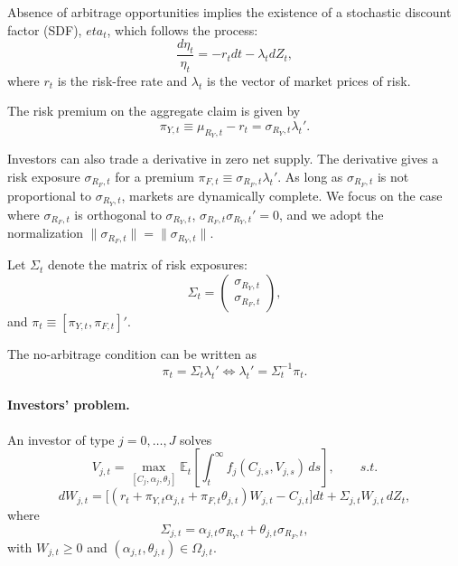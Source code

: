 \documentclass[11pt,english]{article}
\begin{document}
Absence of arbitrage opportunities implies the existence of a stochastic discount factor (SDF), $eta_t$, which follows the process:
\begin{equation}
    \frac{d \eta_t}{\eta_t} = -r_t dt - \lambda_t d Z_t,
\end{equation}
where $r_t$ is the risk-free rate and $\lambda_t$ is the vector of market prices of risk.

The risk premium on the aggregate claim is given by
\begin{equation}
    \pi_{Y,t} \equiv \mu_{R_Y,t} - r_t = \sigma_{R_Y,t} \lambda_t'.
\end{equation}

Investors can also trade a derivative in zero net supply. 
The derivative gives a risk exposure $\sigma_{R_F,t}$ for a premium $\pi_{F,t} \equiv \sigma_{R_F,t} \lambda_t'$.
As long as $\sigma_{R_F,t}$ is not proportional to $\sigma_{R_Y,t}$, markets are dynamically complete.
We focus on the case where $\sigma_{R_F,t}$ is orthogonal to $\sigma_{R_Y,t}$, $\sigma_{R_F,t} \sigma_{R_Y,t}' = 0$, and we adopt the normalization $\|\sigma_{R_F,t}\|  = \|\sigma_{R_Y,t}\|$.

Let $\Sigma_t$ denote the matrix of risk exposures:
\begin{equation}
    \Sigma_t = \begin{pmatrix}
        \sigma_{R_Y,t} \\
		 \sigma_{R_F,t}
    \end{pmatrix},
\end{equation}
and $\pi_t \equiv [\pi_{Y,t}, \pi_{F,t} ]'$.

The no-arbitrage condition can be written as
\begin{equation}
    \pi_t = \Sigma_t \lambda_t' \iff \lambda_t'  = \Sigma_t^{-1} \pi_t.
\end{equation}

\paragraph{Investors' problem.} 

An investor of type $j = 0,\ldots,J$ solves
\begin{equation}\label{eq:inv-problem}
    V_{j,t} = \max_{[C_j,\alpha_j,\theta_j]} 
    \mathbb{E}_t \left[ \int_t^\infty f_j(C_{j,s},V_{j,s})\, ds \right], \qquad s.t.
\end{equation}
\begin{equation}
dW_{j,t} = \big[(r_t + \pi_{Y,t} \alpha_{j,t} + \pi_{F,t} \theta_{j,t}) W_{j,t} - C_{j,t}\big] dt 
    + \Sigma_{j,t} W_{j,t} \, dZ_t,
\end{equation}
where 
\begin{equation}
    \Sigma_{j,t} = \alpha_{j,t} \sigma_{R_Y,t} + \theta_{j,t} \sigma_{R_F,t},
\end{equation}
with $W_{j,t} \geq 0$ and $(\alpha_{j,t}, \theta_{j,t}) \in \Omega_{j,t}$. 
\end{document}
